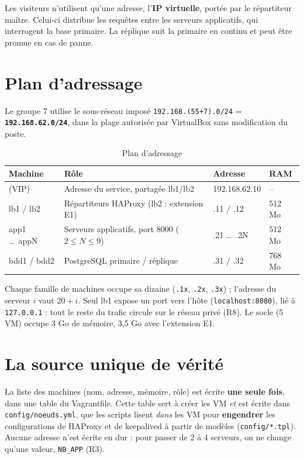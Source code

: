 \documentclass[11pt,a4paper,oneside]{report}
\newcommand{\cmd}[1]{\texttt{#1}}
\begin{document}
	Les visiteurs n'utilisent qu'une adresse, l'\textbf{IP virtuelle}, portée par le répartiteur maître.
	Celui-ci distribue les requêtes entre les serveurs applicatifs, qui interrogent la base primaire.
	La réplique suit la primaire en continu et peut être promue en cas de panne.
	
	\section{Plan d'adressage}
	
	Le groupe 7 utilise le sous-réseau imposé \cmd{192.168.(55+7).0/24} = \textbf{\cmd{192.168.62.0/24}},
	dans la plage autorisée par VirtualBox sans modification du poste.
	
	\begin{table}[H]\centering\small
		\caption{Plan d'adressage}
		\begin{tabular}{@{}l l l l@{}}
			\toprule
			\textbf{Machine} & \textbf{Rôle} & \textbf{Adresse} & \textbf{RAM} \\
			\midrule
			(VIP) & Adresse du service, partagée lb1/lb2 & 192.168.62.10 & -- \\
			lb1 / lb2 & Répartiteurs HAProxy (lb2 : extension E1) & .11 / .12 & 512 Mo \\
			app1 \ldots\ appN & Serveurs applicatifs, port 8000 ($2 \le N \le 9$) & .21 \ldots\ .2N & 512 Mo \\
			bdd1 / bdd2 & PostgreSQL primaire / réplique & .31 / .32 & 768 Mo \\
			\bottomrule
		\end{tabular}
	\end{table}
	
	Chaque famille de machines occupe sa dizaine (\cmd{.1x}, \cmd{.2x}, \cmd{.3x}) ; l'adresse du
	serveur $i$ vaut $20+i$. Seul lb1 expose un port vers l'hôte (\cmd{localhost:8080}), lié à
	\cmd{127.0.0.1} : tout le reste du trafic circule sur le réseau privé (R8). Le socle (5 VM)
	occupe 3 Go de mémoire, 3,5 Go avec l'extension E1.
	
	\section{La source unique de vérité}
	
	La liste des machines (nom, adresse, mémoire, rôle) est écrite \textbf{une seule fois}, dans une
	table du Vagrantfile. Cette table sert à créer les VM \emph{et} est écrite dans
	\cmd{config/noeuds.yml}, que les scripts lisent \emph{dans} les VM pour \textbf{engendrer} les
	configurations de HAProxy et de keepalived à partir de modèles (\cmd{config/*.tpl}).
	Aucune adresse n'est écrite en dur : pour passer de 2 à 4 serveurs, on ne change qu'une valeur,
	\cmd{NB\_APP} (R3).
	
\end{document}
